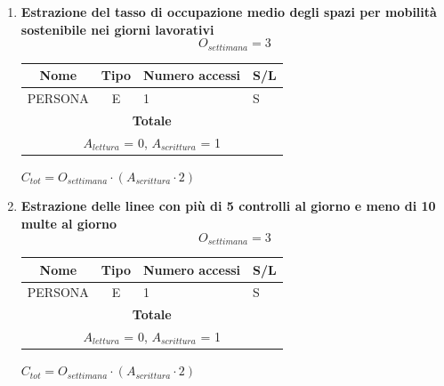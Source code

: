 \documentclass[12pt,a4paper]{report}
\begin{document}
\begin{enumerate}[label=\textbf{\arabic*)}]
    \item \textbf{Estrazione del tasso di occupazione medio degli spazi per mobilità sostenibile nei giorni lavorativi} \\
    \[ {O_{settimana} = 3} \]
    \begin{table}[H]
    \centering
    \begin{tabular}{|c|c|l|l|}
    \hline
    \textbf{Nome} & \textbf{Tipo} & \textbf{Numero accessi} & \textbf{S/L} \\
    \hline
    PERSONA & E & 1 & S \\
    \hline
    \multicolumn{4}{c}{\textbf{Totale}} \\    
    \multicolumn{4}{c}{${A_{lettura}}$ = 0, ${A_{scrittura}}$ = 1} \\
    \hline
    \end{tabular}
    \end{table}
    \begin{center}
    ${C_{tot} = {O_{settimana}}\cdot({A_{scrittura}}\cdot 2)}$
    \end{center}
    
    \item \textbf{Estrazione delle linee con più di 5 controlli al giorno e meno di 10 multe al giorno } \\
    \[ {O_{settimana} = 3} \]
    \begin{table}[H]
    \centering
    \begin{tabular}{|c|c|l|l|}
    \hline
    \textbf{Nome} & \textbf{Tipo} & \textbf{Numero accessi} & \textbf{S/L} \\
    \hline
    PERSONA & E & 1 & S \\
    \hline
    \multicolumn{4}{c}{\textbf{Totale}} \\    
    \multicolumn{4}{c}{${A_{lettura}}$ = 0, ${A_{scrittura}}$ = 1} \\
    \hline
    \end{tabular}
    \end{table}
    \begin{center}
    ${C_{tot} = {O_{settimana}}\cdot({A_{scrittura}}\cdot 2)}$
    \end{center}


\end{enumerate}
\end{document}

